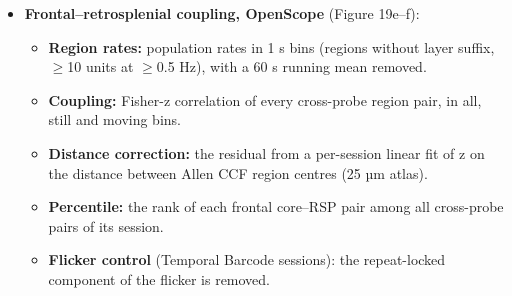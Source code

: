 \documentclass[10pt,a4paper]{article}
\begin{document}
\begin{itemize}
\begin{itemize}
\item \textbf{Rise:} mean fractional change over $-$0.5 to $-$0.05 s against the $-$2 to $-$1 s mean. Sessions need $\geq$3 onsets.
\end{itemize}
\item \textbf{Frontal--retrosplenial coupling, OpenScope} (Figure 19e--f): 
\begin{itemize}
\item \textbf{Region rates:} population rates in 1 s bins (regions without layer suffix, $\geq$10 units at $\geq$0.5 Hz), with a 60 s running mean removed.
\item \textbf{Coupling:} Fisher-z correlation of every cross-probe region pair, in all, still and moving bins.
\item \textbf{Distance correction:} the residual from a per-session linear fit of z on the distance between Allen CCF region centres (25 µm atlas).
\item \textbf{Percentile:} the rank of each frontal core--RSP pair among all cross-probe pairs of its session.
\item \textbf{Flicker control} (Temporal Barcode sessions): the repeat-locked component of the flicker is removed.
\end{itemize}
\end{itemize}
\end{document}
